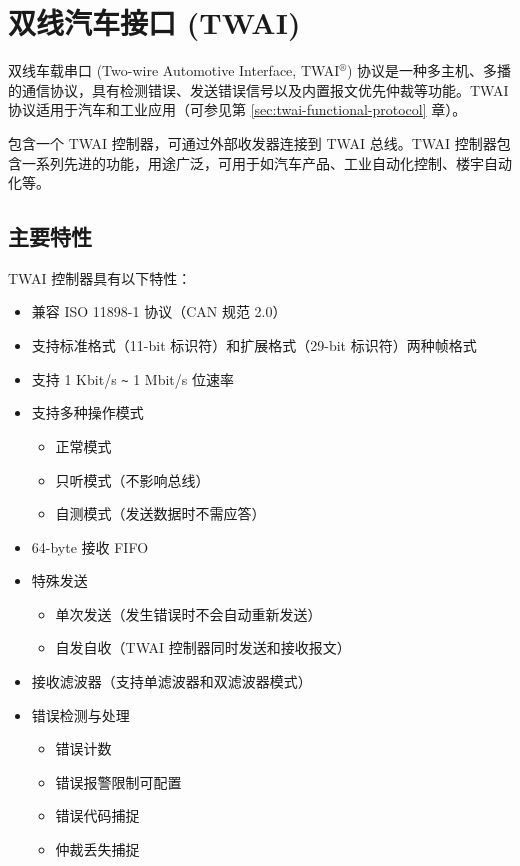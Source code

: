 \documentclass[main\_\_CN.tex]{subfiles}
\begin{document}

\ifglobal
\else
    {\let\clearpage\relax \listoftodos}
    \tableofcontents
\fi




\hypertarget{twai}{}
\chapter{双线汽车接口 (TWAI)}
\label{mod:twai}

双线车载串口 (Two-wire Automotive Interface, TWAI$^\circledR$) 协议是一种多主机、多播的通信协议，具有检测错误、发送错误信号以及内置报文优先仲裁等功能。TWAI 协议适用于汽车和工业应用（可参见第 \ref{sec:twai-functional-protocol} 章）。

\chipname{} 包含一个 TWAI 控制器，可通过外部收发器连接到 TWAI 总线。TWAI 控制器包含一系列先进的功能，用途广泛，可用于如汽车产品、工业自动化控制、楼宇自动化等。

\section{主要特性}
\chipname{} TWAI 控制器具有以下特性：
\begin{itemize}
    \item 兼容 ISO 11898-1 协议（CAN 规范 2.0）
    \item 支持标准格式（11-bit 标识符）和扩展格式（29-bit 标识符）两种帧格式
    \item 支持 1 Kbit/s \verb+~+ 1 Mbit/s 位速率
    \item 支持多种操作模式
    \begin{itemize}
        \item 正常模式
        \item 只听模式（不影响总线）
        \item 自测模式（发送数据时不需应答）
    \end{itemize}
    \item 64-byte 接收 FIFO
    \item 特殊发送
    \begin{itemize}
        \item 单次发送（发生错误时不会自动重新发送）
        \item 自发自收（TWAI 控制器同时发送和接收报文）
    \end{itemize}
    \item 接收滤波器（支持单滤波器和双滤波器模式）
    \item 错误检测与处理  
    \begin{itemize}
        \item 错误计数
        \item 错误报警限制可配置
        \item 错误代码捕捉
        \item 仲裁丢失捕捉
    \end{itemize}
\end{itemize}
\end{document}
